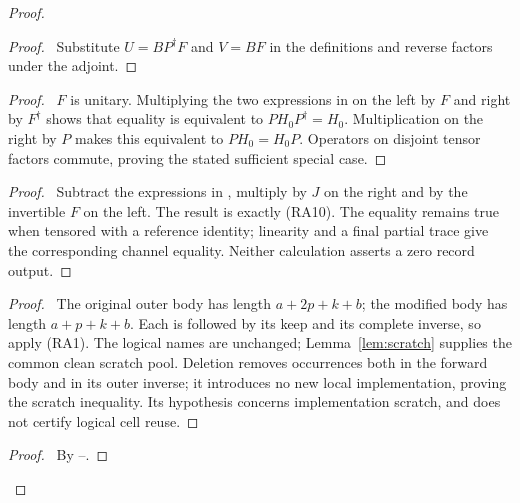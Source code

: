\begin{proof}
 \begin{proof}\pf\ Substitute $U=BP^\dagger F$ and $V=BF$
 in the definitions and reverse factors under the adjoint.\end{proof}
 \begin{proof}\pf\ $F$ is unitary. Multiplying the two expressions
 in  on the left by $F$ and right by
 $F^\dagger$ shows that equality is equivalent to
 $PH_0P^\dagger=H_0$. Multiplication on the right by $P$ makes
 this equivalent to $PH_0=H_0P$. Operators on disjoint tensor factors
 commute, proving the stated sufficient special case.\end{proof}
 \begin{proof}\pf\ Subtract the expressions in
 , multiply by $J$ on the right and
 by the invertible $F$ on the left. The result is exactly (RA10).
 The equality remains true when tensored with a reference identity;
 linearity and a final partial trace give the corresponding channel
 equality. Neither calculation asserts a zero record output.\end{proof}
 \begin{proof}\pf\ The original outer body has length
 $a+2p+k+b$; the modified body has length $a+p+k+b$.
 Each is followed by its keep and its complete inverse, so apply
 (RA1). The logical names are unchanged; Lemma~\ref{lem:scratch}
 supplies the common clean scratch pool. Deletion removes occurrences
 both in the forward body and in its outer inverse; it introduces no
 new local implementation, proving the scratch inequality.
 Its hypothesis concerns
 implementation scratch, and does not certify logical cell reuse.
 \end{proof}
 \qedstep
 \begin{proof}\pf\ By --.
 \end{proof}
\end{proof}

